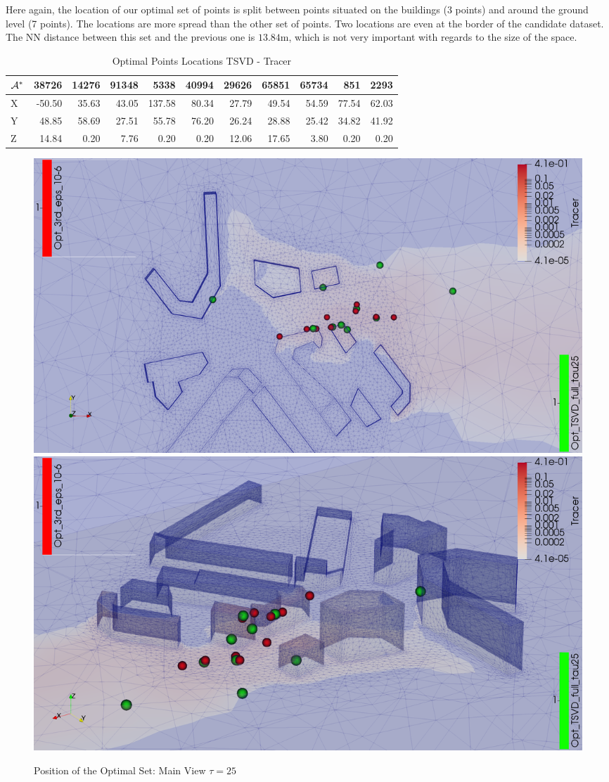 Here again, the location of our optimal set of points is split between points situated on the buildings (3 points) and around the ground level (7 points). The locations are more spread than the other set of points. Two locations are even at the border of the candidate dataset. The NN distance between this set and the previous one is $13.84$m,  which is not very important with regards to the size of the space.  \\ 




\begin{table}[h]
\centering
\footnotesize
\begin{tabular}{l|rrrrrrrrrr}
\toprule
$\mathcal{A}^*$ &  38726 &  14276 &  91348 &  5338  &  40994 &  29626 &  65851 &  65734 &  851   &  2293  \\
\midrule
X & -50.50 &  35.63 &  43.05 & 137.58 &  80.34 &  27.79 &  49.54 &  54.59 &  77.54 &  62.03 \\
Y &  48.85 &  58.69 &  27.51 &  55.78 &  76.20 &  26.24 &  28.88 &  25.42 &  34.82 &  41.92 \\
Z &  14.84 &   0.20 &   7.76 &   0.20 &   0.20 &  12.06 &  17.65 &   3.80 &   0.20 &   0.20 \\
\bottomrule
\end{tabular}
\caption{Optimal Points Locations TSVD - Tracer}
\label{tab:tsvd:data}
\end{table}


\begin{figure}[h!]
\centering
\includegraphics[width=0.7\linewidth]{figures/MainOptimTSVD/tsvd+3rd_position_top}
\smallbreak
\includegraphics[width=0.7\linewidth]{figures/MainOptimTSVD/tsvd+3rd_position_side}
\caption{Position of the Optimal Set: Main View $\tau = 25$}
\label{fig:full_set_tsvd:position:zoom}
\end{figure}


